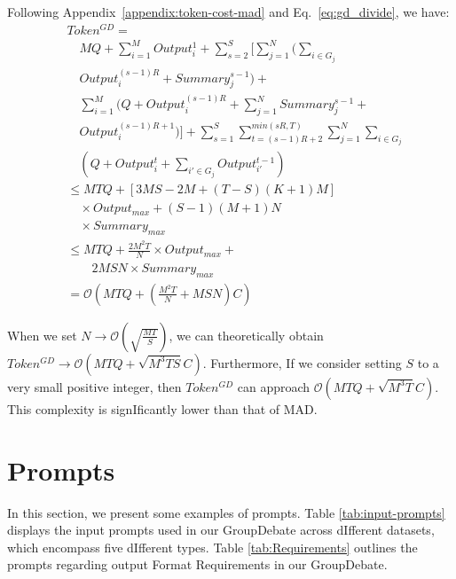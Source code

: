 Following Appendix~\ref{appendix:token-cost-mad} and Eq.~\ref{eq:gd_divide}, we have: 
\begin{equation}
\begin{aligned}
    &Token^{GD}= \\
    &\quad MQ + \sum_{i=1}^M Output_i^1 + \sum_{s=2}^S [\sum_{j=1}^N(\sum_{i\in G_j} \\ 
    & \quad Output_i^{(s-1)R}+Summary_j^{s-1}) + \\
    & \quad \sum_{i=1}^M(Q+Output_i^{(s-1)R}+\sum_{j=1}^N Summary_j^{s-1} +\\
    & \quad Output_i^{(s-1)R+1})] + \sum_{s=1}^S \sum_{t=(s-1)R+2}^{min(sR,T)}\sum_{j=1}^N\sum_{i\in G_j}\\
    &\quad (Q+Output_i^t+\sum_{i' \in G_j}Output_{i'}^{t-1}) \\
    & \leq MTQ + [3MS-2M+(T-S)(K+1)M]\\
    & \quad \times Output_{max} + (S-1)(M+1)N\\
    & \quad \times Summary_{max} \\
    & \leq MTQ+\frac{2M^2T}{N}\times Output_{max} + \\
    & \qquad 2MSN\times Summary_{max} \\
    & = \mathcal{O}\left(MTQ+(\frac{M^2T}{N}+MSN)C\right)
\end{aligned}
\end{equation}

When we set $N \rightarrow \mathcal{O}\left(\sqrt{\frac{MT}{S}}\right)$, we can theoretically obtain $Token^{GD} \rightarrow \mathcal{O}\left(MTQ+\sqrt{M^3TS}C\right)$. Furthermore, If we consider setting $S$ to a very small positive integer, then $Token^{GD}$ can approach $\mathcal{O}\left(MTQ+\sqrt{M^3T}C\right)$. This complexity is signIficantly lower than that of MAD.


\section{Prompts} \label{appendix:prompts}
In this section, we present some examples of prompts. Table \ref{tab:input-prompts} displays the input prompts used in our GroupDebate across dIfferent datasets, which encompass five dIfferent types. Table \ref{tab:Requirements} outlines the prompts regarding output Format Requirements in our GroupDebate.

